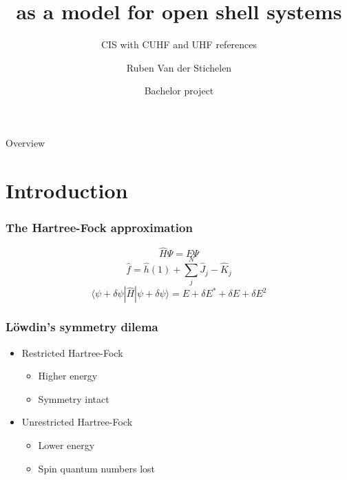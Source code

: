 \documentclass[aspectratio=169]{beamer}
\title{\ce{H3} as a model for open shell systems}
\subtitle{CIS with CUHF and UHF references}
\date[ISBT 2018]{Bachelor project}
\author[DB]{Ruben Van der Stichelen}
\begin{document}
\logoframe

\titleframe

\begin{frame}{Overview}
    \tableofcontents[hideallsubsections]
\end{frame}

\section{Introduction}

\begin{frame}
    \frametitle{The Hartree-Fock approximation}
    \begin{equation}
        \hat{H}\Psi = E\Psi
    \end{equation}
    \begin{equation}
        \hat{f} = \hat{h}(1) + \sum_j^N\hat{J}_j - \hat{K}_j
    \end{equation}
    \begin{equation}
        \langle \psi + \delta\psi | \hat{H} | \psi + \delta\psi \rangle = E + \delta E^* + \delta E + \delta E^2
    \end{equation}
\end{frame}

\begin{frame}
    \frametitle{Löwdin's symmetry dilema}
    \begin{itemize}
        \item Restricted Hartree-Fock
        \begin{itemize}
            \item Higher energy
            \item Symmetry intact
        \end{itemize}
        \item Unrestricted Hartree-Fock
        \begin{itemize}
            \item Lower energy
            \item Spin quantum numbers lost
        \end{itemize}
    \end{itemize}

\end{frame}
\end{document}
